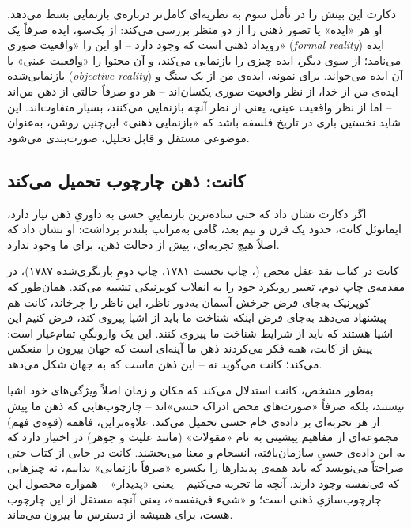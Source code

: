 دکارت این بینش را در تأمل سوم به نظریه‌ای کامل‌تر درباره‌ی بازنمایی بسط می‌دهد. او هر «ایده» یا تصور ذهنی را از دو منظر بررسی می‌کند: از یک‌سو، ایده صرفاً یک رویداد ذهنی است که وجود دارد -- او این را «واقعیت صوری» (\textit{formal reality}) ایده می‌نامد؛ از سوی دیگر، ایده چیزی را بازنمایی می‌کند، و آن محتوا را «واقعیت عینی» یا بازنمایی‌شده (\textit{objective reality}) آن ایده می‌خواند\autocite{sep-descartes-ideas}. برای نمونه، ایده‌ی من از یک سنگ و ایده‌ی من از خدا، از نظر واقعیت صوری یکسان‌اند -- هر دو صرفاً حالتی از ذهن من‌اند -- اما از نظر واقعیت عینی، یعنی از نظر آنچه بازنمایی می‌کنند، بسیار متفاوت‌اند. این شاید نخستین باری در تاریخ فلسفه باشد که «بازنمایی ذهنی» این‌چنین روشن، به‌عنوان موضوعی مستقل و قابل تحلیل، صورت‌بندی می‌شود.


\subsection{کانت: ذهن چارچوب تحمیل می‌کند}
\label{sub:kant-framework}

اگر دکارت نشان داد که حتی ساده‌ترین بازنماییِ حسی به داوریِ ذهن نیاز دارد، ایمانوئل کانت، حدود یک قرن و نیم بعد، گامی به‌مراتب بلندتر برداشت: او نشان داد که اصلاً هیچ تجربه‌ای، پیش از دخالت ذهن، برای ما وجود ندارد.

کانت در کتاب نقد عقل محض (، چاپ نخست ۱۷۸۱، چاپ دومِ بازنگری‌شده ۱۷۸۷)، در مقدمه‌ی چاپ دوم، تغییر رویکرد خود را به انقلاب کوپرنیکی تشبیه می‌کند. همان‌طور که کوپرنیک به‌جای فرض چرخش آسمان به‌دور ناظر، این ناظر را چرخاند، کانت هم پیشنهاد می‌دهد به‌جای فرض اینکه شناخت ما باید از اشیا پیروی کند، فرض کنیم این اشیا هستند که باید از شرایط شناخت ما پیروی کنند\autocite{kant-critique}. این یک وارونگیِ تمام‌عیار است: پیش از کانت، همه فکر می‌کردند ذهن ما آینه‌ای است که جهان بیرون را منعکس می‌کند؛ کانت می‌گوید نه -- این ذهن ماست که به جهان شکل می‌دهد.

به‌طور مشخص، کانت استدلال می‌کند که مکان و زمان اصلاً ویژگی‌های خود اشیا نیستند، بلکه صرفاً «صورت‌های محض ادراک حسی»اند -- چارچوب‌هایی که ذهن ما پیش از هر تجربه‌ای بر داده‌ی خام حسی تحمیل می‌کند. علاوه‌براین، فاهمه (قوه‌ی فهم) مجموعه‌ای از مفاهیم پیشینی به نام «مقولات» (مانند علیت و جوهر) در اختیار دارد که به این داده‌ی حسیِ سازمان‌یافته، انسجام و معنا می‌بخشند. کانت در جایی از کتاب حتی صراحتاً می‌نویسد که باید همه‌ی پدیدارها را یکسره «صرفاً بازنمایی» بدانیم، نه چیزهایی که فی‌نفسه وجود دارند\autocite{sep-kant-idealism}. آنچه ما تجربه می‌کنیم -- یعنی «پدیدار» -- همواره محصول این چارچوب‌سازیِ ذهنی است؛ و «شیء فی‌نفسه»، یعنی آنچه مستقل از این چارچوب هست، برای همیشه از دسترس ما بیرون می‌ماند.

